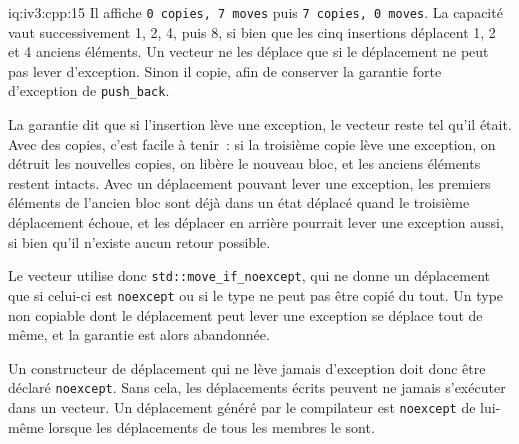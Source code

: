 \begin{solution}{iq:iv3:cpp:15}
Il affiche \texttt{0 copies, 7 moves} puis \texttt{7 copies, 0 moves}. La capacité vaut successivement 1, 2, 4, puis 8, si bien que les cinq insertions déplacent 1, 2 et 4 anciens éléments. Un vecteur ne les déplace que si le déplacement ne peut pas lever d'exception. Sinon il copie, afin de conserver la garantie forte d'exception de \texttt{push\_back}.

La garantie dit que si l'insertion lève une exception, le vecteur reste tel qu'il était. Avec des copies, c'est facile à tenir~: si la troisième copie lève une exception, on détruit les nouvelles copies, on libère le nouveau bloc, et les anciens éléments restent intacts. Avec un déplacement pouvant lever une exception, les premiers éléments de l'ancien bloc sont déjà dans un état déplacé quand le troisième déplacement échoue, et les déplacer en arrière pourrait lever une exception aussi, si bien qu'il n'existe aucun retour possible.

Le vecteur utilise donc \texttt{std::move\_if\_noexcept}, qui ne donne un déplacement que si celui-ci est \texttt{noexcept} ou si le type ne peut pas être copié du tout. Un type non copiable dont le déplacement peut lever une exception se déplace tout de même, et la garantie est alors abandonnée.

Un constructeur de déplacement qui ne lève jamais d'exception doit donc être déclaré \texttt{noexcept}. Sans cela, les déplacements écrits peuvent ne jamais s'exécuter dans un vecteur. Un déplacement généré par le compilateur est \texttt{noexcept} de lui-même lorsque les déplacements de tous les membres le sont.

\end{solution}

